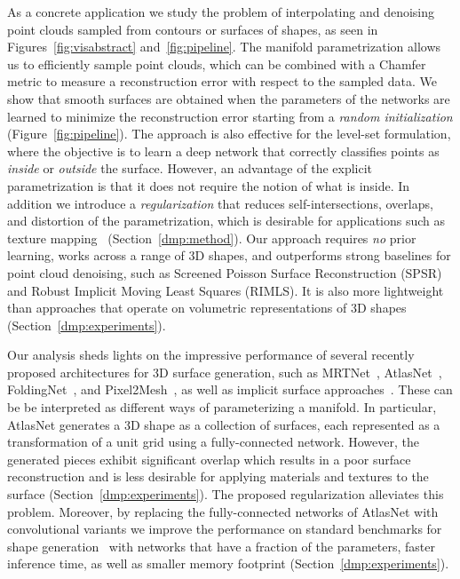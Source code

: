 As a concrete application we study the problem of 
interpolating and denoising point clouds sampled from contours or surfaces of
shapes, as seen in Figures~\ref{fig:visabstract} and~\ref{fig:pipeline}.
The manifold parametrization allows us to efficiently sample point
clouds, which can be combined with a Chamfer metric to measure a
reconstruction error with respect to the sampled data. 
We show that smooth surfaces are obtained when the parameters of the networks are learned to minimize the reconstruction error starting from a \emph{random initialization} (Figure~\ref{fig:pipeline}).
The approach is also effective for the level-set formulation, where the objective is to learn a deep network that correctly classifies points as \emph{inside} or \emph{outside} the surface.
However, an advantage of the explicit parametrization is that it does
not require the notion of what is inside.
In addition we introduce a \emph{regularization} that reduces self-intersections, overlaps, and distortion of the parametrization, which is desirable for applications such as texture mapping ~(Section~\ref{dmp:method}).
Our approach requires \emph{no} prior learning, works across a range of 3D
shapes, and outperforms strong baselines for point cloud denoising, 
such as Screened Poisson Surface Reconstruction (SPSR) and Robust Implicit Moving Least Squares (RIMLS).
It is also more lightweight than approaches that
operate on volumetric representations of 3D shapes (Section~\ref{dmp:experiments}).

Our analysis sheds lights on the impressive performance of several
recently proposed architectures for 3D surface generation, such as
MRTNet~\cite{mrt18}, AtlasNet~\cite{atlasnet}, FoldingNet~\cite{yang2018foldingnet}, and Pixel2Mesh~\cite{pixel2mesh}, as well as implicit surface approaches~\cite{chen2019learning,mescheder2019occupancy,genova2019learning,park2019deepsdf}.
These can be be interpreted
as different ways of parameterizing a manifold.
In particular, AtlasNet generates a 3D shape as a collection of surfaces, each represented as a
transformation of a unit grid using a fully-connected network.
However, the generated pieces exhibit significant overlap which
results in a poor surface reconstruction and is less desirable for
applying materials and textures to the surface (Section~\ref{dmp:experiments}).
The proposed regularization alleviates this problem. 
Moreover, by replacing the fully-connected networks of AtlasNet with
convolutional variants we improve the performance on standard
benchmarks for shape generation~\cite{choy20163d} with networks that have a
fraction of the parameters, faster inference time, as well
as smaller memory footprint (Section~\ref{dmp:experiments}).
